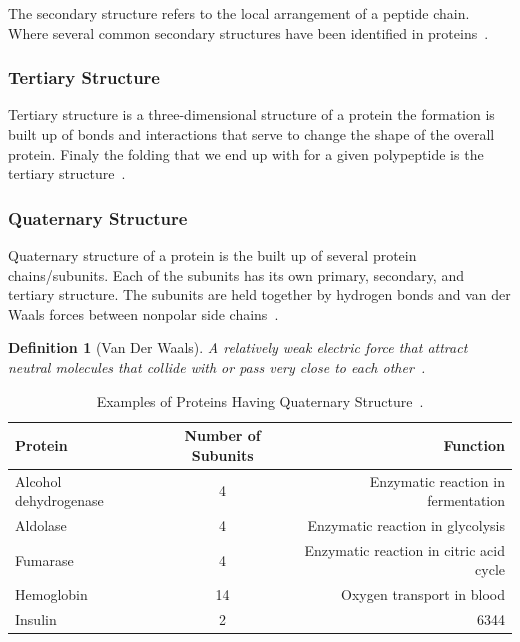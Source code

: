 \documentclass{report}
\newtheorem{definition}{Definition}[section]
\begin{document}
The secondary structure refers to the local arrangement of a peptide chain. Where several common secondary structures have been identified in proteins~\cite{noauthor_levels_nodate}.

\subsubsection{Tertiary Structure}

Tertiary structure is a three-dimensional structure of a protein the formation is built up of bonds and interactions that serve to change the shape of the overall protein. Finaly the folding that we end up with for a given polypeptide is the tertiary structure~\cite{godbey_chapter_2022}.

\subsubsection{Quaternary Structure}

Quaternary structure of a protein is the built up of several protein chains/subunits. Each of the subunits has its own primary, secondary, and tertiary structure. The subunits are held together by hydrogen bonds and van der Waals forces between nonpolar side chains~\cite{ouellette_14_2015}.

\begin{definition}[Van Der Waals]
    A relatively weak electric force that attract neutral molecules that collide with or pass very close to each other~\cite{noauthor_210_2018}.
\end{definition}

\begin{table}[h!]
    \begin{center}
    \label{tab:Quanternanry Protiens}
        \begin{tabular}{l|c|r}
            \hline
            Protein & Number of Subunits & Function\\
            \hline
            Alcohol dehydrogenase & 4 & Enzymatic reaction in fermentation\\ 
            \hline
            Aldolase & 4 & Enzymatic reaction in glycolysis\\
            \hline
            Fumarase & 4 & Enzymatic reaction in citric acid cycle \\
            \hline
            Hemoglobin & 14 & Oxygen transport in blood\\
            \hline
            Insulin & 2 & 6344\\
            \hline
        \end{tabular}
        \caption{\label{Quanternanry Protiens}Examples of Proteins Having Quaternary Structure~\cite{ouellette_14_2015}.}
    \end{center}
\end{table}
\end{document}
